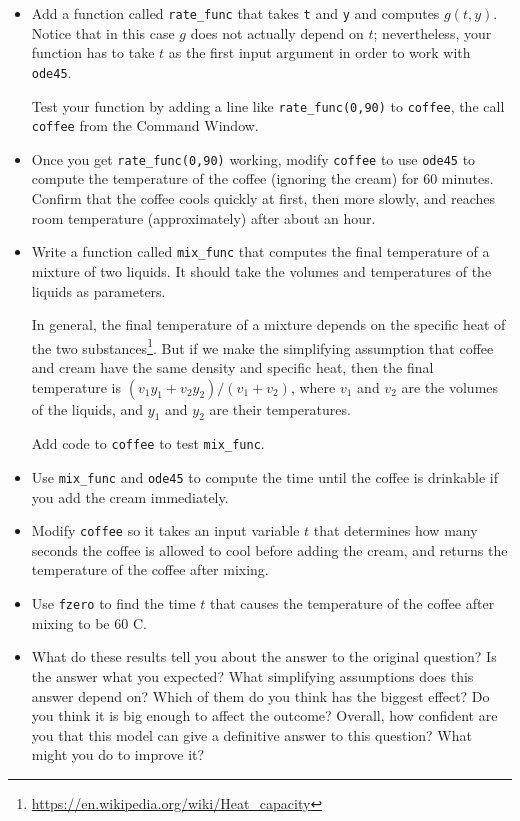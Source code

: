 \documentclass{book}
\begin{document}
\begin{ex}
\begin{itemize}
\item Add a function called
{\tt rate\_func} that takes {\tt t} and {\tt y} and computes
$g(t,y)$.  Notice that in this case $g$ does not actually
depend on $t$; nevertheless, your function has to take $t$ as
the first input argument in order to work with {\tt ode45}.

Test your function by adding a line like {\tt rate\_func(0,90)}
to {\tt coffee}, the call {\tt coffee} from the Command Window.

\item Once you get {\tt rate\_func(0,90)} working, modify
{\tt coffee} to use {\tt ode45} to compute the temperature
of the coffee (ignoring the cream) for 60 minutes.  Confirm that
the coffee cools quickly at first, then more slowly, and reaches
room temperature (approximately) after about an hour.

\item Write a function called {\tt mix\_func} that computes
the final temperature of a mixture of two liquids.  It should
take the volumes and temperatures of the liquids as parameters.

In general, the final temperature of a mixture depends on the specific
heat of the two
substances\footnote{\url{https://en.wikipedia.org/wiki/Heat_capacity}}.
But if we make the simplifying assumption that coffee and cream
have the same density and specific heat, then the final temperature is
$(v_1 y_1 + v_2 y_2) / (v_1 + v_2)$, where $v_1$ and $v_2$ are
the volumes of the liquids, and $y_1$ and $y_2$ are their
temperatures.

Add code to {\tt coffee} to test {\tt mix\_func}.

\item Use {\tt mix\_func} and {\tt ode45} to compute the
time until the coffee is drinkable if you add the cream
immediately.

\item Modify {\tt coffee} so it takes an input variable $t$ that
determines how many seconds the coffee is allowed to cool before
adding the cream, and returns the temperature of the coffee
after mixing.

\item Use {\tt fzero} to find the time $t$ that causes the
temperature of the coffee after mixing to be 60 \degree C.

\item What do these results tell you about the answer to the original
question?  Is the answer what you expected?  What simplifying
assumptions does this answer depend on?  Which of them do you think
has the biggest effect?  Do you think it is big enough to affect the
outcome?  Overall, how confident are you that this model can give
a definitive answer to this question?  What might you do to improve
it?

\end{itemize}

\end{ex}
\end{document}
